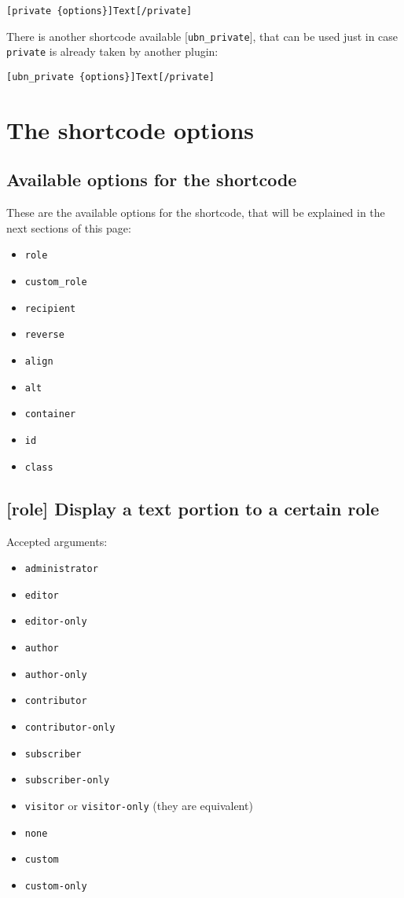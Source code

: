 \documentclass[a4paper,10pt]{article}
\begin{document}
\begin{lstlisting}
[private {options}]Text[/private]
\end{lstlisting}

There is another shortcode available [\verb+ubn_private+], that can be used just in case \verb+private+ is already taken by another plugin:

\begin{lstlisting}
[ubn_private {options}]Text[/private]
\end{lstlisting}

\section{The shortcode options}

\subsection{Available options for the shortcode}

These are the available options for the shortcode, that will be explained in the next sections of this page:

\begin{itemize}
 \item \verb+role+
 \item \verb+custom_role+
 \item \verb+recipient+
 \item \verb+reverse+
 \item \verb+align+
 \item \verb+alt+
 \item \verb+container+
 \item \verb+id+
 \item \verb+class+
\end{itemize}

\subsection{[role] Display a text portion to a certain role}

Accepted arguments:

\begin{itemize}
 \item \verb+administrator+
 \item \verb+editor+
 \item \verb+editor-only+
 \item \verb+author+
 \item \verb+author-only+
 \item \verb+contributor+
 \item \verb+contributor-only+
 \item \verb+subscriber+
 \item \verb+subscriber-only+
 \item \verb+visitor+ or \verb+visitor-only+ (they are equivalent)
 \item \verb+none+
 \item \verb+custom+
 \item \verb+custom-only+
\end{itemize}
\end{document}

